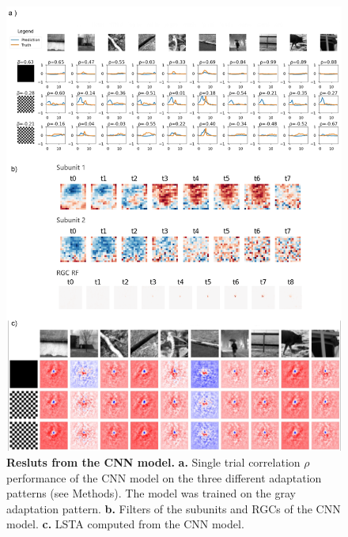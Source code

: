 \begin{figure}
    \centering
    \vspace*{-3cm}
    \includegraphics[width=\textwidth]{pics/CNNResults.png}
    \caption{\textbf{Resluts from the CNN model.} \textbf{a.} Single trial
        correlation $\rho$ performance
        of the CNN model on the three different adaptation patterns (see
        Methods). The model
        was
        trained on the gray adaptation pattern. \textbf{b.} Filters of the
        subunits and
        RGCs of the CNN model. \textbf{c.} LSTA computed from the CNN model.}
    \label{fig:CNNResults}
\end{figure}

\clearpage